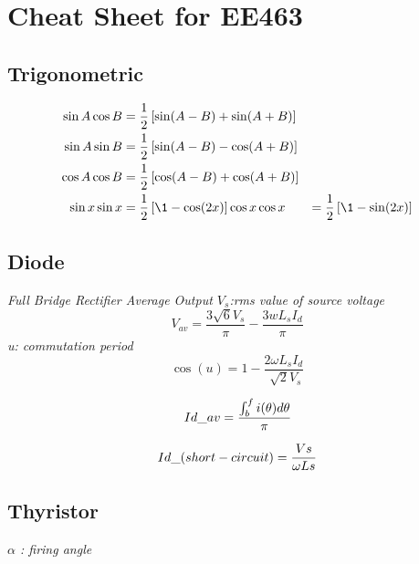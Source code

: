 \documentclass[twocolumn, ]{article}
\begin{document}
\section{\small Cheat Sheet for EE463}

\subsection{ \small Trigonometric }

\begin{align*}
          \sin A \cos B &= \frac{1}{2}\left[ \sin(A-B)+\sin(A+B) \right] \\
          \sin A \sin B &= \frac{1}{2}\left[ \sin(A-B)-\cos(A+B) \right] \\
          \cos A \cos B &= \frac{1}{2}\left[ \cos(A-B)+\cos(A+B) \right] \\ 
	  \sin x \sin x &= \frac{1}{2}\left[ \1 - \cos(2x)  \right]
	  \cos x \cos x &= \frac{1}{2}\left[ \1 - \sin(2x)  \right]
\end{align*}

\subsection{\small Diode}

\textit{Full Bridge Rectifier Average Output $V_{s}$:rms value of source voltage}
\begin{equation*}
 	V_{av}=\frac{3 \sqrt{6} V_{s}}{\pi }-\frac{3wL_{s}I_{d}}{\pi }
\end{equation*}
\textit {u: commutation period}
\begin{equation*}
 	\cos(u)=1-\dfrac{2\omega L_{s} I_{d}}{\sqrt[]{2}V_{s}}
\end{equation*}

\begin{equation*}
 	\\ Id\_{av}= \dfrac{\int_b^f i(\theta) d \theta}{\pi}  \\
\end{equation*}

\begin{equation*}
 	\\ Id\_{(short-circuit)} = \dfrac{Vs}{\omega Ls}\\ 
\end{equation*}


\subsection{\small Thyristor}
\textit{$\alpha$ : firing angle}
\end{document}
